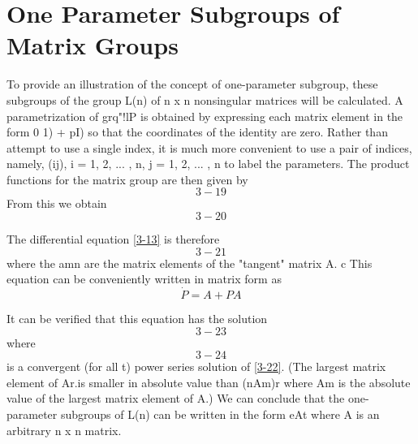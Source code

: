 \section{One Parameter Subgroups of Matrix Groups}
To provide an illustration of the concept of one-parameter subgroup, these subgroups of the group L(n) of n x n nonsingular matrices will be calculated. A parametrization of     grq"!lP is obtained by expressing each matrix element in the form 0 1) + pI) so that the coordinates of the identity are zero. Rather than attempt to use a single index, it is much more convenient to use a pair of indices, namely, (ij), i = 1, 2, ... , n, j = 1, 2, ... , n to label the parameters.
The product functions for the matrix group are then given by 
  \begin{equation}   %
      3-19
  \end{equation}
From this we obtain
  \begin{equation}   %
      3-20
  \end{equation}

The differential equation \eqref{3-13} is therefore
  \begin{equation*}   %
      3-21
  \end{equation*}
where the amn are the matrix elements of the "tangent" matrix A. c
This equation can be conveniently written in matrix form as
  \begin{equation}   %
      \dot{P} = A + PA
  \end{equation}

It can be verified that this equation has the solution 
  \begin{equation*}   %
      3-23
  \end{equation*}
where
  \begin{equation*}   %
      3-24
  \end{equation*}
is a convergent (for all t) power series solution of \eqref{3-22}. (The largest matrix element of Ar.is smaller in absolute value than (nAm)r where Am is the absolute value of the largest matrix element of A.) We can conclude that the one-parameter subgroups of L(n) can be written in the form eAt where A is an arbitrary n x n matrix.


\endinput  %